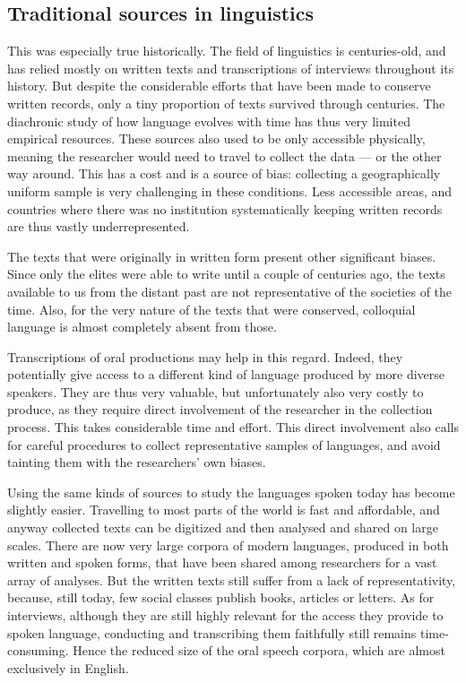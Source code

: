 \documentclass[../thesis.tex]{subfiles}
\begin{document}
\subsection{Traditional sources in linguistics}
This was especially true historically. The field of linguistics is centuries-old, and
has relied mostly on written texts and transcriptions of interviews throughout its
history. But despite the considerable efforts that have been made to conserve written records, only a tiny proportion of texts survived through
centuries. The diachronic study of how language evolves with time has thus very limited
empirical resources. These sources also used to be only accessible physically, meaning
the researcher would need to travel to collect the data --- or the other way around.
This has a cost and is a source of bias: collecting a geographically uniform
sample is very challenging in these conditions. Less accessible areas, and countries
where there was no institution systematically keeping written records are thus vastly
underrepresented.

The texts that were originally in written form present other significant biases. Since
only the elites were able to write until a couple of centuries ago, the texts available
to us from the distant past are not representative of the societies of the time. Also,
for the very nature of the texts that were conserved, colloquial language is almost
completely absent from those.

Transcriptions of oral productions may help in this regard. Indeed, they potentially
give access to a different kind of language produced by more diverse speakers. They are
thus very valuable, but unfortunately also very costly to produce, as they require
direct involvement of the researcher in the collection process. This takes considerable
time and effort. This direct involvement also calls for careful procedures to collect
representative samples of languages, and avoid tainting them with the researchers' own
biases. 

Using the same kinds of sources to study the languages spoken today has become slightly
easier. Travelling to most parts of the world is fast and affordable, and anyway
collected texts can be digitized and then analysed and shared on large scales. There are
now very large corpora of modern languages, produced in both written
\cite{GrieveCorpusbasedRegional2009,GrieveRegionalVariation2016,BiberCorpusBasedInvestigations1996,McEnerySwearingModern2004}
and spoken
\cite{McEnerySwearingModern2004,SchweinbergerSwearingIrish2018,StenstromTrendsTeenage2002,LabovSocialStratification1966}
forms, that have been shared among researchers for a vast array of analyses. But the
written texts still suffer from a lack of representativity, because, still today, few
social classes publish books, articles or letters. As for interviews, although they are
still highly relevant for the access they provide to spoken language, conducting and
transcribing them faithfully still remains time-consuming. Hence the reduced size of the
oral speech corpora, which are almost exclusively in English.
\end{document}
